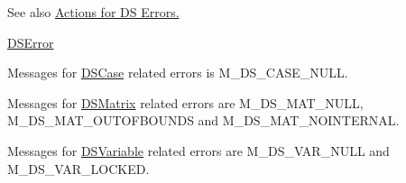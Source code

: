 \begin{DoxySeeAlso}{See also}
\hyperlink{group___a___d_s___actions}{Actions for DS Errors.} 

\hyperlink{_d_s_errors_8h_a09b28eb2b01986855910ca97dfe91144}{DSError}
\end{DoxySeeAlso}
Messages for \hyperlink{struct_d_s_case}{DSCase} related errors is M\_\-DS\_\-CASE\_\-NULL.

Messages for \hyperlink{struct_d_s_matrix}{DSMatrix} related errors are M\_\-DS\_\-MAT\_\-NULL, M\_\-DS\_\-MAT\_\-OUTOFBOUNDS and M\_\-DS\_\-MAT\_\-NOINTERNAL.

Messages for \hyperlink{struct_d_s_variable}{DSVariable} related errors are M\_\-DS\_\-VAR\_\-NULL and M\_\-DS\_\-VAR\_\-LOCKED. 